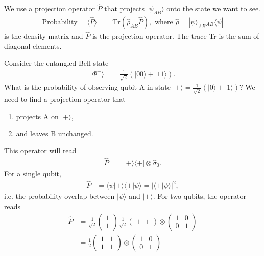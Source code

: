 \documentclass[a4paper, 11pt, normalem]{report}
\begin{document}
We use a projection operator $\hat{P}$ that projects $|\psi_{AB}\rangle$ onto the state we want to see.
\begin{align}
    \text{Probability} = \langle\hat{P}\rangle &= \text{Tr}(\hat{\rho}_{AB}\hat{P}), \text{ where } \hat{\rho} = |\psi\rangle_{AB} {}_{AB}\langle\psi|
\end{align}
is the density matrix and $\hat{P}$ is the projection operator.
The trace Tr is the sum of diagonal elements.
\begin{example}
    Consider the entangled Bell state
    \begin{align}
        |\Phi^+\rangle &= \frac{1}{\sqrt{2}}\left(|00\rangle+|11\rangle\right).
    \end{align}
    What is the probability of observing qubit A in state $|+\rangle=\frac{1}{\sqrt{2}}(|0\rangle+|1\rangle)$?
    We need to find a projection operator that
    \begin{enumerate}
        \item projects A on $|+\rangle$,
        \item and leaves B unchanged.
    \end{enumerate}
    This operator will read
    \begin{align}
        \hat{P} &= |+\rangle\langle+| \otimes \hat{\sigma}_0.
    \end{align}
    For a single qubit,
    \begin{align}
        \hat{P} &= \langle\psi|+\rangle\langle+|\psi\rangle = |\langle+|\psi\rangle|^2,
    \end{align}
    i.e. the probability overlap between $|\psi\rangle$ and $|+\rangle$.
    For two qubits, the operator reads
    \begin{align}
        \hat{P} &= \frac{1}{\sqrt{2}}\begin{pmatrix}1\\1\end{pmatrix}\frac{1}{\sqrt{2}}\begin{pmatrix} 1 & 1\end{pmatrix} \otimes \begin{pmatrix} 1 & 0 \\ 0 & 1\end{pmatrix} \\
                &= \frac12\begin{pmatrix} 1 & 1 \\ 1 & 1\end{pmatrix} \otimes \begin{pmatrix}1 & 0 \\ 0 & 1\end{pmatrix} \\

\end{align}
\end{example}
\end{document}
